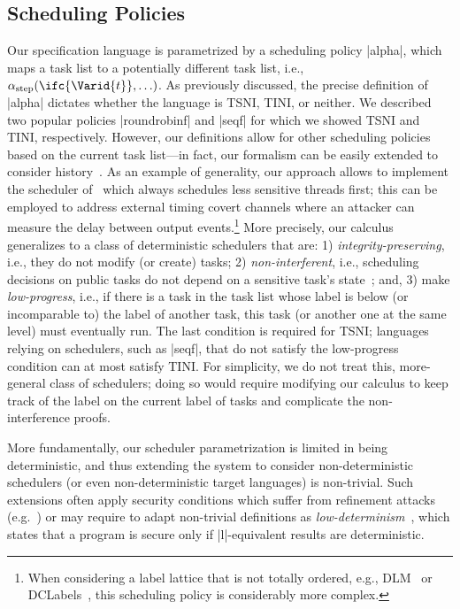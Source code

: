 \subsection{Scheduling Policies}
Our specification language is parametrized by a scheduling policy |alpha|, which
maps a task list to a potentially different task list, i.e.,
$\alpha_{{\tiny\mathrm{\text{step}}}}(\ifc{\Varid{t}},\ldots)$. 
%
As previously discussed, the precise definition of |alpha|
dictates whether the language is TSNI, TINI, or neither.
%
We described two popular policies |roundrobinf| and
|seqf| for which we showed TSNI and TINI, respectively.
%
However, our definitions allow for other scheduling policies based on the
current task list---in fact, our formalism can be easily 
extended to consider history~\cite{BartheRRS07}.
%
As an example of generality, our approach allows to implement the scheduler of~\cite{Kashyap:2011}
which always schedules less sensitive threads first; this can be
employed to address external timing covert channels where an attacker
can measure the delay between output events.\footnote{
  When considering a label lattice that is not totally ordered, e.g.,
  DLM~\cite{myers:dlm} or DCLabels~\cite{dclabels}, this scheduling policy is
  considerably more complex.
}
%
More precisely, our calculus generalizes to a class of deterministic
schedulers that are: 1) \emph{integrity-preserving}, i.e., they do not
modify (or create) tasks; 2) \emph{non-interferent}, i.e., 
scheduling decisions on public tasks do not depend on a sensitive task's
state~\cite{russo2006securing}; and, 3) make \emph{low-progress}, i.e., if there
is a task in the task list whose label is below (or incomparable to) the label
of another task, this task (or another one at the same level) must eventually
run.
%
The last condition is required for TSNI; languages relying on
schedulers, such as |seqf|, that do not satisfy the low-progress
condition can at most satisfy TINI.
%
For simplicity, we do not treat this, more-general class of schedulers;
doing so would require modifying our calculus to keep track of the
label on the current label of tasks and complicate the
non-interference proofs.

More fundamentally, our scheduler parametrization is limited in being
deterministic, and thus extending the system to consider non-deterministic
schedulers (or even non-deterministic target languages) is non-trivial.
%
%
%
Such extensions often apply security conditions which suffer 
from refinement attacks (e.g.~\cite{Smith:Volpano:MultiThreaded}) or may require to
adapt non-trivial definitions as
\emph{low-determinism}~\cite{Zdancewic:Myers:CSFW03,Huisman:Worah:Sunesen:CSFW06,Terauchi:2008},
which states that a program is secure only if |l|-equivalent results are
deterministic.





